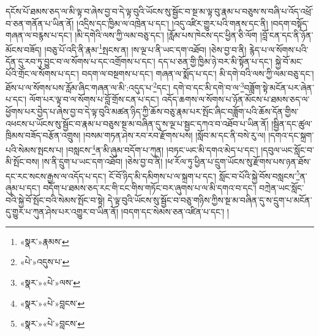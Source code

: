 དངོས་པོ་ཐམས་ཅད་ལ་མི་ལྟ་བ་ཞེས་བྱ་བ་དེ་ལྟ་བུའི་ཡོངས་སུ་སྦྱོང་བ་སྔ་མ་ལྟ་བུ་རྣམ་པ་བཅུས་ས་བཞི་པ་འོད་འཕྲོ་བ་ཅན་གནོན་པ་ཡིན་ནོ། །འདྲིས་དང་ཁྱིམ་ལ་འཁྲེན་པ་དང་། །འདུ་འཛིར་གྱུར་པའི་གནས་དང་ནི། །བདག་བསྟོད་གཞན་ལ་བརྙས་པ་དང་། །མི་དགེའི་ལས་ཀྱི་ལམ་བཅུ་དང་། །རློམ་པས་ཁེངས་དང་ཕྱིན་ཅི་ལོག །བློ་ངན་དང་ནི་ཉོན་མོངས་བཟོད། །བཅུ་པོ་འདི་ནི་རྣམ་\footnote{«སྣར་»རྣམས་}སྤངས་ན། །ས་ལྔ་པ་ནི་ཡང་དག་འཐོབ། །ཅེས་བྱ་བ་ནི། རྙེད་པ་ལ་སོགས་པའི་དོན་དུ་རབ་ཏུ་བྱུང་བ་ལ་སོགས་པ་དང་འགྲོགས་པ་དང་། དད་པ་ཅན་གྱི་ཁྱིམ་ཉེ་བར་མི་སྟོན་པ་དང་། སྐྱེ་བོ་མང་པོའི་གྲོང་ལ་སོགས་པ་དང་། བདག་ལ་བསྔགས་པ་དང་། གཞན་ལ་སྨོད་པ་དང་། མི་དགེ་བའི་ལས་ཀྱི་ལམ་བཅུ་དང་། ཐོས་པ་ལ་སོགས་པས་རློམ་ཞིང་གཞན་ལ་མི་:འདུད་པ་\footnote{«པེ་»འདུས་པ་}དང་། དགེ་བ་དང་མི་དགེ་བ་ལ་\footnote{«སྣར་»«པེ་»ལས་}བཟློག་སྟེ་མངོན་པར་ཞེན་པ་དང་། ལོག་པར་ལྟ་བ་ལ་སོགས་པ་བློ་གྲོས་ངན་པ་དང་། འདོད་ཆགས་ལ་སོགས་པ་ཉོན་མོངས་པ་ཐམས་ཅད་ལ་ཕྱོགས་པར་བྱེད་པ་ཞེས་བྱ་བ་དེ་ལྟ་བུའི་མཚན་ཉིད་ཀྱི་ཆོས་བཅུ་རྣམ་པར་སྤོང་ཞིང་བཟློག་པའི་ཆོས་དོན་གྱིས་འཕངས་པ་ཡོངས་སུ་སྦྱོང་བ་རྣམ་པ་བཅུས་སྔ་མ་བཞིན་དུ་ས་ལྔ་པ་སྦྱང་དཀའ་བ་འཐོབ་པ་ཡིན་ནོ། །སྦྱིན་དང་ཚུལ་ཁྲིམས་བཟོད་བརྩོན་འགྲུས། །བསམ་གཏན་ཤེས་རབ་རབ་རྫོགས་པས། །སློབ་མ་དང་ནི་བསེ་རུ་ལ། །དགའ་དང་སྐྲག་པའི་སེམས་སྤངས་པ། །བསླངས་\footnote{«སྣར་»«པེ་»བླངས་}ན་མི་ཞུམ་བདོག་པ་ཀུན། །བཏང་ཡང་མི་དགའ་མེད་པ་དང་། །དབུལ་ཡང་སློང་བ་མི་སྤོང་བས། །ས་ནི་དྲུག་པ་ཡང་དག་འཐོབ། །ཅེས་བྱ་བ་ནི། །ཕ་རོལ་ཏུ་ཕྱིན་པ་དྲུག་ཡོངས་སུ་རྫོགས་པས་ཉན་ཐོས་དང་རང་སངས་རྒྱས་ལ་འདོད་པ་དང་། ངོ་བོ་ཉིད་མི་དམིགས་པ་ལ་སྐྲག་པ་དང་། སློང་བ་པོའི་སྐྱེ་བོས་བསླངས་\footnote{«སྣར་»«པེ་»བླངས་}ན་ཞུམ་པ་དང་། བདོག་པ་ཐམས་ཅད་རང་གི་ངང་གིས་གཏོང་བར་ཞུགས་པ་ལ་མི་དགའ་བ་དང་། བཀྲེན་ཡང་སློང་བའི་སྐྱེ་བོ་སྤོང་བའི་སེམས་སྤོང་བ་སྟེ། དེ་ལྟ་བུའི་ཡོངས་སུ་སྦྱོང་བ་བཅུ་གཉིས་ཀྱིས་སྔ་མ་བཞིན་དུ་ས་དྲུག་པ་མངོན་དུ་གྱུར་པ་ཀུན་ཤེས་པར་འགྱུར་བ་ཡིན་ནོ། །བདག་དང་སེམས་ཅན་འཛིན་པ་དང་། །
